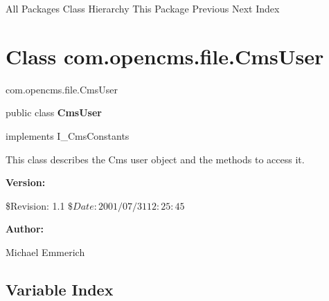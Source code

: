 \begin{PRE}
All Packages  Class Hierarchy  This Package  Previous  Next  Index
\end{PRE}

\htmlHR

\section{  Class com.opencms.file.CmsUser }

\begin{PRE}
com.opencms.file.CmsUser
\end{PRE}

\htmlHR

\begin{description}
\item public class {\bf CmsUser}  
\item implements I\_CmsConstants 
\end{description}

This class describes the Cms user object and the methods to access it. 

\begin{description}
\item {\bf Version:}  

\$Revision: 1.1 $ \$Date: 2001/07/31 12:25:45 $  
\item {\bf Author:}  

Michael Emmerich 
\end{description}

\htmlHR

\subsection*{  Variable Index }

